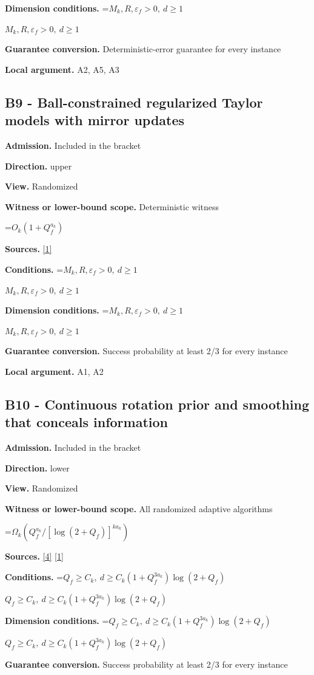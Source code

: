 \documentclass[10pt,a4paper]{article}
\newcommand{\AtlasMath}[1]{\par\begingroup\centering\setbox0=\hbox{$\displaystyle #1$}\ifdim\wd0>1.4\linewidth\typeout{ATLAS WIDE FORMULA: \the\wd0}\fi\ifdim\wd0>\linewidth\resizebox{\linewidth}{!}{\box0}\else\box0\fi\par\endgroup}
\newcommand{\AtlasInlineMath}[1]{\begingroup\setbox0=\hbox{$#1$}\ifdim\wd0>.4\linewidth\endgroup\AtlasMath{#1}\else\endgroup$#1$\fi}
\begin{document}
\textbf{Dimension conditions.} \AtlasInlineMath{M_k,R,\varepsilon_f>0,\ d\ge1}

\textbf{Guarantee conversion.} Deterministic-error guarantee for every instance

\textbf{Local argument.} A2, A5, A3

\subsection{B9 - Ball-constrained regularized Taylor models with mirror updates}
\textbf{Admission.} Included in the bracket

\textbf{Direction.} upper

\textbf{View.} Randomized

\textbf{Witness or lower-bound scope.} Deterministic witness

\AtlasMath{O_k(1+Q_f^{a_k})}
\textbf{Sources.} \href{https://arxiv.org/pdf/2411.08987v2}{[1]}

\textbf{Conditions.} \AtlasInlineMath{M_k,R,\varepsilon_f>0,\ d\ge1}

\textbf{Dimension conditions.} \AtlasInlineMath{M_k,R,\varepsilon_f>0,\ d\ge1}

\textbf{Guarantee conversion.} Success probability at least 2/3 for every instance

\textbf{Local argument.} A1, A2

\subsection{B10 - Continuous rotation prior and smoothing that conceals information}
\textbf{Admission.} Included in the bracket

\textbf{Direction.} lower

\textbf{View.} Randomized

\textbf{Witness or lower-bound scope.} All randomized adaptive algorithms

\AtlasMath{\Omega_k(Q_f^{a_k}/[\log(2+Q_f)]^{k a_k})}
\textbf{Sources.} \href{https://arxiv.org/pdf/2112.01118v1}{[4]} \href{https://arxiv.org/pdf/2411.08987v2}{[1]}

\textbf{Conditions.} \AtlasInlineMath{Q_f\ge C_k,\ d\ge C_k(1+Q_f^{3a_k})\log(2+Q_f)}

\textbf{Dimension conditions.} \AtlasInlineMath{Q_f\ge C_k,\ d\ge C_k(1+Q_f^{3a_k})\log(2+Q_f)}

\textbf{Guarantee conversion.} Success probability at least 2/3 for every instance
\end{document}
